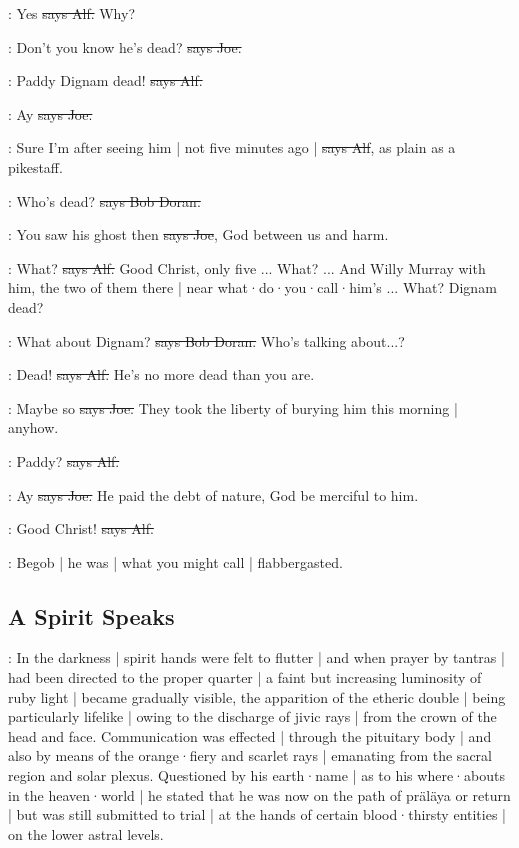 \bergan:
Yes
\sout{says Alf.}
Why?

\joe:
Don't you know he's dead?
\sout{says Joe.}

\bergan:
Paddy Dignam dead!
\sout{says Alf.}

\joe:
Ay
\sout{says Joe.}

\bergan:
Sure I'm after seeing him |
not five minutes ago |
\sout{says Alf},
as plain as a pikestaff.

\doran:
Who's dead?
\sout{says Bob Doran.}

\joe:
You saw his ghost then
\sout{says Joe},
God between us and harm.

\bergan:
What?
\sout{says Alf.}
Good Christ,
only five ...
What?
...
And Willy Murray with him,
the two of them there |
near what·do·you·call·him's ...
What?
Dignam dead?

\doran:
What about Dignam?
\sout{says Bob Doran.}
Who's talking about...?

\bergan:
Dead!
\sout{says Alf.}
He's no more dead than you are.

\joe:
Maybe so
\sout{says Joe.}
They took the liberty of burying him this morning |
anyhow.

\bergan:
Paddy?
\sout{says Alf.}

\joe:
Ay
\sout{says Joe.}
He paid the debt of nature,
God be merciful to him.

\bergan:
Good Christ!
\sout{says Alf.}

\Nq:
Begob |
he was |
what you might call |
flabbergasted.


\subsection*{A Spirit Speaks}

:
In the darkness |
spirit hands were felt to flutter |
and when prayer by tantras |
had been directed to the proper quarter |
a faint but increasing luminosity of ruby light |
became gradually visible,
the apparition of the etheric double |
being particularly lifelike |
owing to the discharge of jivic rays |
from the crown of the head and face.
Communication was effected |
through the pituitary body |
and also by means of the orange·fiery and scarlet rays |
emanating from the sacral region and solar plexus.
Questioned by his earth·name |
as to his where·abouts in the heaven·world |
he stated that he was now on the path of präläya or return |
but was still submitted to trial |
at the hands of certain blood·thirsty entities |
on the lower astral levels.

